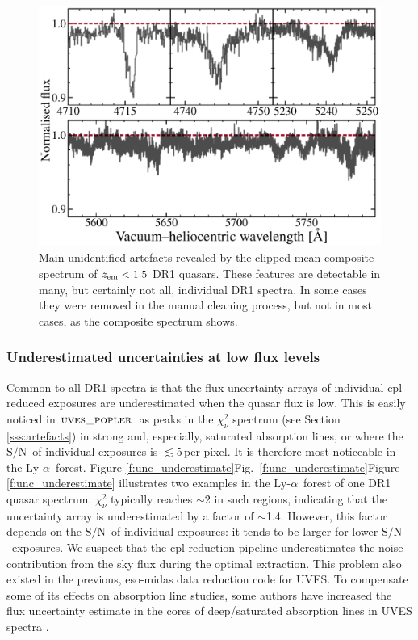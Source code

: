 \documentclass[fleqn,usenatbib,usedcolumn]{mnras}
\renewcommand{\la}{\lesssim} %
\newcommand{\Sref}[1]{Section \ref{#1}}
\newcommand{\Fref}[1]{\ifhmode \ifnum\spacefactor=1001 Figure \ref{#1}\else Fig.\ \ref{#1}\fi \else Figure \ref{#1}\fi}
\newcommand{\SN}{\ensuremath{\textrm{S/N}}}
\newcommand{\lya}{\ensuremath{\textrm{Ly-}\alpha}}
\newcommand{\zem}{\ensuremath{z_\textrm{\scriptsize em}}}
\newcommand{\popler}{\ensuremath{\textsc{uves\_popler}}}
\begin{document}
\begin{figure}
\begin{center}
\includegraphics[width=0.95\columnwidth]{DR1_unidentified.pdf}
\vspace{-1em}
\caption{Main unidentified artefacts revealed by the clipped mean composite spectrum of $\zem<1.5$ DR1 quasars. These features are detectable in many, but certainly not all, individual DR1 spectra. In some cases they were removed in the manual cleaning process, but not in most cases, as the composite spectrum shows.}
\label{f:unidentified}
\end{center}
\end{figure}

\subsubsection{Underestimated uncertainties at low flux levels}\label{sss:low_flux}

Common to all DR1 spectra is that the flux uncertainty arrays of individual {\sc cpl}-reduced exposures are underestimated when the quasar flux is low. This is easily noticed in \popler\ as peaks in the $\chi^2_\nu$ spectrum (see \Sref{sss:artefacts}) in strong and, especially, saturated absorption lines, or where the \SN\ of individual exposures is $\la$5\,per pixel. It is therefore most noticeable in the \lya\ forest. \Fref{f:unc_underestimate} illustrates two examples in the \lya\ forest of one DR1 quasar spectrum. $\chi^2_\nu$ typically reaches $\sim$2 in such regions, indicating that the uncertainty array is underestimated by a factor of $\sim$1.4. However, this factor depends on the \SN\ of individual exposures: it tends to be larger for lower \SN\ exposures. We suspect that the {\sc cpl} reduction pipeline underestimates the noise contribution from the sky flux during the optimal extraction. This problem also existed in the previous, {\sc eso-midas} data reduction code for UVES. To compensate some of its effects on absorption line studies, some authors have increased the flux uncertainty estimate in the cores of deep/saturated absorption lines in UVES spectra \citep[e.g.][]{King:2012:3370}.
\end{document}
